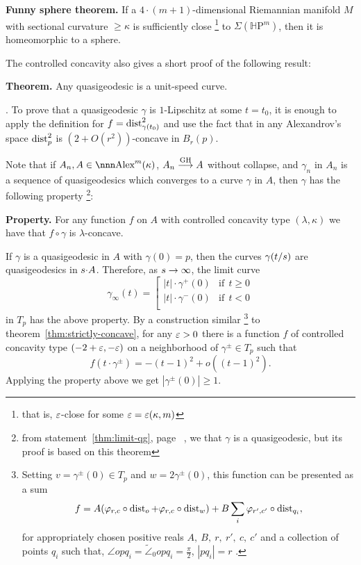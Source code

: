 \documentclass{article}
\begin{document}
\begin{thm}{\bf Funny sphere theorem.}
If a $4{\cdot}(m+1)$-dimensional Riemannian manifold $M$ with sectional curvature $\ge\kappa$ is
sufficiently close%
\footnote{that is, $\varepsilon$-close for some $\varepsilon=\varepsilon(\kappa,m)$} 
to $\Sigma(\mathbb H\mathrm P^m)$, then it
is homeomorphic to a sphere.
\end{thm}

The controlled concavity also gives a short proof of the following result:

\begin{thm}{\bf Theorem.}\label{thm:unit-speed} Any quasigeodesic is a
unit-speed curve.
\end{thm}

\Proof.  To prove that a quasigeodesic $\gamma$ is $1$-Lipschitz at some $t=t_0$,
it is enough to apply the definition for $f=\operatorname{dist}_{\gamma(t_0)}^2$ and use the fact
that in any Alexandrov's space $\operatorname{dist}_p^2$ is $(2+O(r^2))$-concave in
$B_r(p)$.

Note that if $A_n,A\in\Alex^m(\kappa)$, $A_n\GHto A$ without collapse, and
$\gamma_n$ in $A_n$ is a sequence of quasigeodesics which converges to a curve
$\gamma$ in $A$, then $\gamma$ has the following property%
\footnote{from statement~\ref{thm:limit-qg}, page~\pageref{thm:limit-qg}%
, we that $\gamma$ is a quasigeodesic, but its proof is based on this theorem}:

\begin{thm}{\bf Property.}\label{propr:weak-qg}
For any function $f$ on $A$ with controlled concavity type $(\lambda,\kappa)$ we
have that $f\circ\gamma$ is $\lambda$-concave.
\end{thm}

If $\gamma$  is a quasigeodesic in $A$ with $\gamma(0)=p$, then the curves
$\gamma(t/s)$ are quasigeodesics in $s{\cdot} A$. 
Therefore, as $s\to\infty$, the limit curve
$$\gamma_\infty(t)=\left[\begin{matrix}
|t|\cdot\gamma^+(0)&\text{if}\ \  t\ge0\\
|t|\cdot\gamma^-(0)&\text{if}\ \  t<0\\
          \end{matrix}\right.$$
in $T_p$ has the above property.
By a construction similar%
\footnote{Setting $v=\gamma^\pm(0)\in T_p$ and
$w=2\gamma^\pm(0)$, this function can be presented as a sum
$$f=A(\varphi_{r,c}\circ\operatorname{dist}_{o}+\varphi_{r,c}\circ\operatorname{dist}_w)+B\sum_i\varphi_{r',c'}
\circ\operatorname{dist}_{q_i},$$
for appropriately chosen positive reals 
$A,\ B,\ r,\ r',\ c,\ c'$ and a collection of points $q_i$ such that,
$\angle o p q_i=\tilde\angle_0 o p q_i=\tfrac\pi2$, $|p q_i|=r$ .} 
to theorem~\ref{thm:strictly-concave}, for any $\varepsilon>0$ there is a function $f$ of controlled
concavity type $(-2+\varepsilon,-\varepsilon)$ on a neighborhood of $\gamma^\pm\in T_p$ such that
$$f(t\cdot\gamma^\pm)=-(t-1)^2+o((t-1)^2).$$
Applying the property above we get $|\gamma^\pm(0)|\ge 1$. 
\qeds
\end{document}

